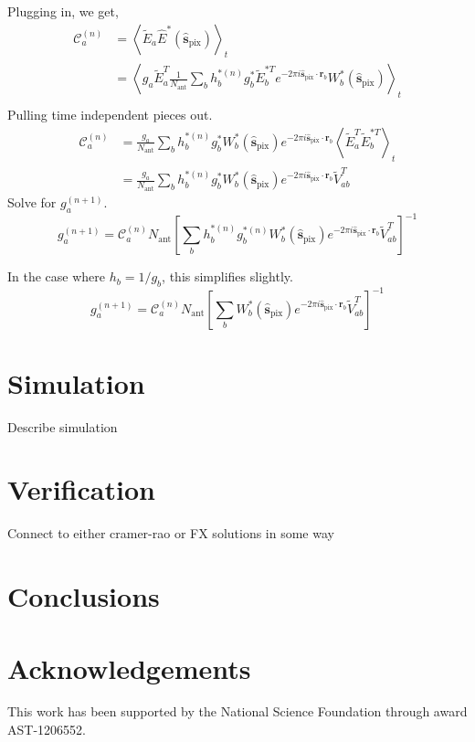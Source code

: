 \documentclass[a4paper,fleqn,usenatbib]{../mnras}
\newcommand{\spix}{\hat{\mathbf{s}}_{\mathrm{pix}}}
\newcommand{\Cna}{\mathcal{C}^{(n)}_a}
\newcommand{\rb}{\mathbf{r}_b}
\newcommand{\Nant}{N_{\mathrm{ant}}}
\newcommand{\beamtheta}{W}
\newcommand{\Er}[1]{\widetilde{E}_{#1}}
\newcommand{\V}{\widetilde{V}}
\begin{document}
Plugging in, we get,
\begin{align}
\Cna & = \left<\Er{a} \hat{E}^*(\spix)\right>_t \\ 
& = \left<g_a \Er{a}^T \frac{1}{\Nant} \sum_b h^{*(n)}_b g^*_b\Er{b}^{*T} e^{-2\pi i \spix \cdot \rb} \beamtheta^*_b(\spix)\right>_t \\
\end{align}
Pulling time independent pieces out.
\begin{align}
\Cna & = \frac{g_a}{\Nant} \sum_b h^{*(n)}_b g^*_b \beamtheta^*_b(\spix) e^{-2\pi i \spix \cdot \rb} \left<\Er{a}^T \Er{b}^{*T} \right>_t \\
& = \frac{g_a}{\Nant} \sum_b h^{*(n)}_b g^*_b \beamtheta^*_b(\spix) e^{-2\pi i \spix \cdot \rb} \V^T_{ab}
\end{align}
Solve for $g^{(n+1)}_a$.
\begin{equation}
g^{(n+1)}_a = \Cna \Nant \left[ \sum_b h^{*(n)}_b g^{*(n)}_b \beamtheta^*_b(\spix) e^{-2\pi i \spix \cdot \rb} \V^T_{ab} \right]^{-1}
\end{equation}

In the case where $h_b = 1/g_b$, this simplifies slightly.
\begin{equation}
g^{(n+1)}_a = \Cna \Nant \left[ \sum_b \beamtheta^*_b(\spix) e^{-2\pi i \spix \cdot \rb} \V^T_{ab} \right]^{-1}
\end{equation}


\section{Simulation}

Describe simulation

\section{Verification}

Connect to either cramer-rao or FX solutions in some way


\section{Conclusions}
\section*{Acknowledgements}
This work has been supported by the National Science Foundation through award AST-1206552.


\end{document}
